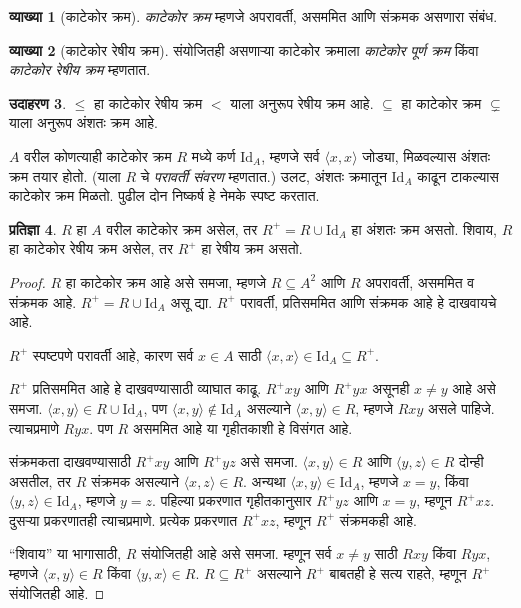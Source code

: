 \documentclass[11pt,a4paper,openany]{book}
\theoremstyle{definition}
\newtheorem{defn}{व्याख्या}[section]
\newtheorem{ex}[defn]{उदाहरण}
\newtheorem{prop}[defn]{प्रतिज्ञा}
\newcommand{\tuple}[1]{\langle #1\rangle}
\newcommand{\Id}[1]{\mathord{\mathrm{Id}_{#1}}}
\begin{document}
\begin{defn}[काटेकोर क्रम]
\emph{काटेकोर क्रम} म्हणजे अपरावर्ती, असममित आणि संक्रमक असणारा संबंध.
\end{defn}

\begin{defn}[काटेकोर रेषीय क्रम]\label{sfr:rel:ord:def:strictlinearorder}
संयोजितही असणाऱ्या काटेकोर क्रमाला \emph{काटेकोर पूर्ण क्रम} किंवा
\emph{काटेकोर रेषीय क्रम} म्हणतात.
\end{defn}

\begin{ex}
$\le$ हा काटेकोर रेषीय क्रम $<$ याला अनुरूप रेषीय क्रम आहे.
$\subseteq$ हा काटेकोर क्रम $\subsetneq$ याला अनुरूप अंशतः क्रम आहे.
\end{ex}

$A$ वरील कोणत्याही काटेकोर क्रम $R$ मध्ये कर्ण $\Id{A}$, म्हणजे सर्व
$\tuple{x, x}$ जोड्या, मिळवल्यास अंशतः क्रम तयार होतो. (याला $R$ चे
\emph{परावर्ती संवरण} म्हणतात.) उलट, अंशतः क्रमातून $\Id{A}$ काढून
टाकल्यास काटेकोर क्रम मिळतो. पुढील दोन निष्कर्ष हे नेमके स्पष्ट करतात.

\begin{prop}\label{sfr:rel:ord:prop:stricttopartial}
$R$ हा $A$ वरील काटेकोर क्रम असेल, तर $R^+ = R \cup \Id{A}$ हा अंशतः
क्रम असतो. शिवाय, $R$ हा काटेकोर रेषीय क्रम असेल, तर $R^+$ हा रेषीय
क्रम असतो.
\end{prop}

\begin{proof}
$R$ हा काटेकोर क्रम आहे असे समजा, म्हणजे $R \subseteq A^2$ आणि $R$
अपरावर्ती, असममित व संक्रमक आहे. $R^+ = R \cup \Id{A}$ असू द्या.
$R^+$ परावर्ती, प्रतिसममित आणि संक्रमक आहे हे दाखवायचे आहे.

$R^+$ स्पष्टपणे परावर्ती आहे, कारण सर्व $x \in A$ साठी
$\tuple{x, x} \in \Id{A} \subseteq R^+$.

$R^+$ प्रतिसममित आहे हे दाखवण्यासाठी व्याघात काढू. $R^+xy$ आणि $R^+yx$
असूनही $x \neq y$ आहे असे समजा. $\tuple{x,y} \in R \cup \Id{A}$,
पण $\tuple{x, y} \notin \Id{A}$ असल्याने $\tuple{x, y} \in R$, म्हणजे
$Rxy$ असले पाहिजे. त्याचप्रमाणे $Ryx$. पण $R$ असममित आहे या
गृहीतकाशी हे विसंगत आहे.

संक्रमकता दाखवण्यासाठी $R^+xy$ आणि $R^+yz$ असे समजा.
$\tuple{x, y} \in R$ आणि $\tuple{y,z} \in R$ दोन्ही असतील, तर $R$
संक्रमक असल्याने $\tuple{x, z} \in R$. अन्यथा $\tuple{x, y} \in \Id{A}$,
म्हणजे $x = y$, किंवा $\tuple{y, z} \in \Id{A}$, म्हणजे $y = z$.
पहिल्या प्रकरणात गृहीतकानुसार $R^+yz$ आणि $x = y$, म्हणून $R^+xz$.
दुसऱ्या प्रकरणातही त्याचप्रमाणे. प्रत्येक प्रकरणात $R^+xz$, म्हणून
$R^+$ संक्रमकही आहे.

``शिवाय'' या भागासाठी, $R$ संयोजितही आहे असे समजा. म्हणून सर्व
$x \neq y$ साठी $Rxy$ किंवा $Ryx$, म्हणजे $\tuple{x, y} \in R$ किंवा
$\tuple{y, x} \in R$. $R \subseteq R^+$ असल्याने $R^+$ बाबतही हे सत्य
राहते, म्हणून $R^+$ संयोजितही आहे.
\end{proof}
\end{document}
